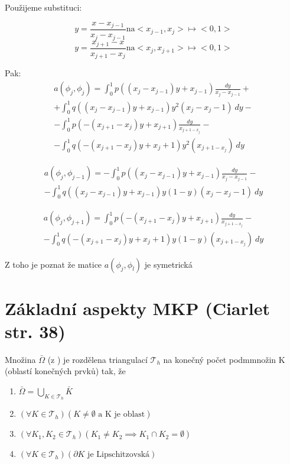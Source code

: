 \documentclass[../main.tex]{subfiles}
\begin{document}
\begin{example}[MKP v 1D]
Použijeme substituci: 

\begin{equation}
    y = \frac{x - x_{j-1}}{x_j - x_{j-1}} \text{na} <x_{j-1}, x_j> \mapsto <0,1>
\end{equation}
\begin{equation}
    y = \frac{x_{j+1} - x}{x_{j+1} - x_{j}} \text{na} <x_{j}, x_{j+1}> \mapsto <0,1>
\end{equation}

Pak: 
\begin{multline}
    a(\phi_j, \phi_j) = \int_0^1 p((x_j - x_{j-1})y + x_{j-1}) \frac{dy}{x_j - x_{j-1}} +\\+ \int_0^1 q((x_j - x_{j-1})y + x_{j-1}) y^2 (x_j - x_j-1) \ dy -\\- \int_0^1 p(-(x_{j+1} - x_j)y + x_{j+1}) \frac{dy}{ x_{j+1 - x_j}} -\\- \int_0^1 q(-(x_{j+1} - x_j)y + x_j+1) y^2 (x_{j+1 - x_j}) \ dy
\end{multline}

\begin{multline}
    a(\phi_j, \phi_{j-1}) = - \int_0^1 p((x_j - x_{j-1})y + x_{j-1}) \frac{dy}{x_j - x_{j-1}} -\\- \int_0^1 q((x_j - x_{j-1})y + x_{j-1}) y(1-y) (x_j - x_j-1) \ dy
\end{multline}

\begin{multline}
    a(\phi_j, \phi_{j+1}) = \int_0^1 p(-(x_{j+1} - x_j)y + x_{j+1}) \frac{dy}{ x_{j+1 - x_j}} -\\- \int_0^1 q(-(x_{j+1} - x_j)y + x_j+1) y(1-y) (x_{j+1 - x_j}) \ dy
\end{multline}

Z toho je poznat že matice $a(\phi_j, \phi_l)$ je symetrická
\end{example}

\section{Základní aspekty MKP (Ciarlet str. 38)}
\begin{theorem}[MKP1]
    Množina $\bar{\Omega}$ (z ) je rozdělena triangulací $\mathcal{T}_h$ na konečný počet podmmnožin K (oblastí konečných prvků) tak, že 
    \begin{enumerate}
        \item $\bar{\Omega} = \bigcup_{K\in\mathcal{T}_h} \bar{K}$
        \item $(\forall K  \in \mathcal{T}_h)(K\neq\emptyset \text{ a K je oblast})$
        \item $(\forall K_1, K_2 \in \mathcal{T}_h)(K_1 \neq K_2 \implies K_1 \cap K_2 = \emptyset)$
        \item $(\forall K \in \mathcal{T}_h) (\partial K \text{ je Lipschitzovská} )$
    \end{enumerate}
\end{theorem}
\end{document}
